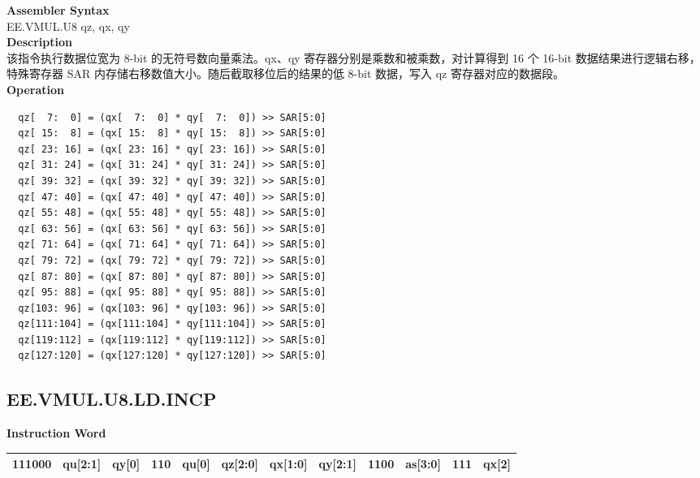 \textbf{Assembler Syntax} \\
EE.VMUL.U8 qz, qx, qy \\
\textbf{Description} \\
该指令执行数据位宽为 8-bit 的无符号数向量乘法。qx、qy 寄存器分别是乘数和被乘数，对计算得到 16 个 16-bit 数据结果进行逻辑右移，特殊寄存器 SAR 内存储右移数值大小。随后截取移位后的结果的低 8-bit 数据，写入 qz 寄存器对应的数据段。\\
\textbf{Operation}
\begin{lstlisting}
  qz[  7:  0] = (qx[  7:  0] * qy[  7:  0]) >> SAR[5:0]
  qz[ 15:  8] = (qx[ 15:  8] * qy[ 15:  8]) >> SAR[5:0]
  qz[ 23: 16] = (qx[ 23: 16] * qy[ 23: 16]) >> SAR[5:0]
  qz[ 31: 24] = (qx[ 31: 24] * qy[ 31: 24]) >> SAR[5:0]
  qz[ 39: 32] = (qx[ 39: 32] * qy[ 39: 32]) >> SAR[5:0]
  qz[ 47: 40] = (qx[ 47: 40] * qy[ 47: 40]) >> SAR[5:0]
  qz[ 55: 48] = (qx[ 55: 48] * qy[ 55: 48]) >> SAR[5:0]
  qz[ 63: 56] = (qx[ 63: 56] * qy[ 63: 56]) >> SAR[5:0]
  qz[ 71: 64] = (qx[ 71: 64] * qy[ 71: 64]) >> SAR[5:0]
  qz[ 79: 72] = (qx[ 79: 72] * qy[ 79: 72]) >> SAR[5:0]
  qz[ 87: 80] = (qx[ 87: 80] * qy[ 87: 80]) >> SAR[5:0]
  qz[ 95: 88] = (qx[ 95: 88] * qy[ 95: 88]) >> SAR[5:0]
  qz[103: 96] = (qx[103: 96] * qy[103: 96]) >> SAR[5:0]
  qz[111:104] = (qx[111:104] * qy[111:104]) >> SAR[5:0]
  qz[119:112] = (qx[119:112] * qy[119:112]) >> SAR[5:0]
  qz[127:120] = (qx[127:120] * qy[127:120]) >> SAR[5:0]
\end{lstlisting}

\clearpage
\subsection{EE.VMUL.U8.LD.INCP}\label{instruction:EEVMULU8LDINCP}
\setlength\tabcolsep{6pt}
\textbf{Instruction Word} \\
\begin{tabular}{|c|c|c|c|c|c|c|c|c|c|c|c|}
	\hline
	111000 & qu[2:1] & qy[0] & 110 & qu[0] & qz[2:0] & qx[1:0] & qy[2:1] & 1100 & as[3:0] & 111 & qx[2] \\
	\hline
\end{tabular}

